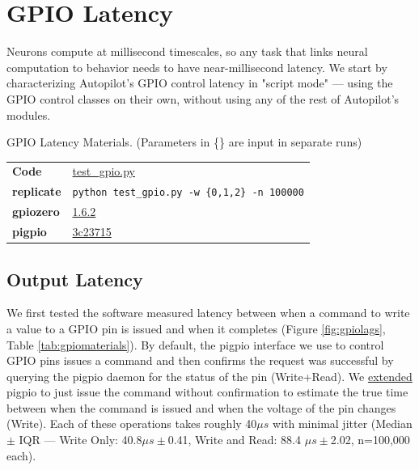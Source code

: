 \section{GPIO Latency}
\label{sec:gpiolatency}

Neurons compute at millisecond timescales, so any task that links neural computation to behavior needs to have near-millisecond latency. We start by characterizing Autopilot's GPIO control latency in "script mode" --- using the GPIO control classes on their own, without using any of the rest of Autopilot's modules.

\begin{margintable}[0.5cm]
\caption{GPIO Latency Materials. (Parameters in \{\} are input in separate runs)}
\label{tab:gpiomaterials}
\noindent\begin{tabularx}{\linewidth}{lX}%
\toprule
\textbf{Code} & \href{https://github.com/auto-pi-lot/plugin-paper/blob/main/plugin_paper/scripts/test_gpio.py}{test\_gpio.py} \\
\textbf{replicate} & \texttt{python test\_gpio.py -w \{0,1,2\} -n 100000}\\
\textbf{gpiozero} & \href{https://github.com/auto-pi-lot/plugin-paper/blob/main/plugin_paper/hardware/zero.py}{1.6.2} \\
\textbf{pigpio} & \href{https://github.com/sneakers-the-rat/pigpio/commit/3c237159e5995ec58cd673579bdd66a8d819b269}{3c23715} \\
\bottomrule
\end{tabularx}
\end{margintable}

\subsection{Output Latency}

We first tested the software measured latency between when a command to write a value to a GPIO pin is issued and when it completes (Figure \ref{fig:gpiolags}, Table \ref{tab:gpiomaterials}). By default, the pigpio interface we use to control GPIO pins issues a command and then confirms the request was successful by querying the pigpio daemon for the status of the pin (Write+Read). We \href{https://github.com/sneakers-the-rat/pigpio/commit/0782de06f0a5c092063118733ad2df9d65f1f1a0}{extended} pigpio to just issue the command without confirmation to estimate the true time between when the command is issued and when the voltage of the pin changes (Write). Each of these operations takes roughly 40$\mu s$ with minimal jitter (Median $\pm$ IQR --- Write Only: 40.8$\mu s \pm$0.41, Write and Read: 88.4 $\mu s \pm$2.02, n=100,000 each).


